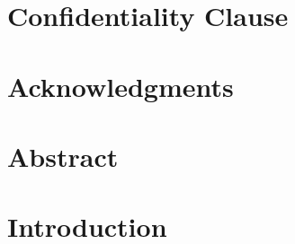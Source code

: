 \documentclass[11pt, twoside]{article}
\numberwithin{equation}{section}
\numberwithin{table}{section}
\numberwithin{figure}{section}
\begin{document}
\thispagestyle{empty}	


\newpage



\thispagestyle{empty}
\section*{Confidentiality Clause}

\clearpage





\newpage
\thispagestyle{empty}
\section*{Acknowledgments}




\newpage
\thispagestyle{empty}
\section*{Abstract}



	
\fancyhf{}
\fancyhead[LO,RE]{\footnotesize \nouppercase{\leftmark}}
\thispagestyle{empty}
\tableofcontents
\newpage 



\setcounter{page}{1} 





\fancyhf{}
\fancyhead[LO]{\footnotesize \nouppercase{\rightmark}}
\fancyhead[RE]{\footnotesize \nouppercase{\leftmark}}
\fancyhead[RO,LE]{\footnotesize \thepage}

\thispagestyle{plain}
\section{Introduction} \label{sec:introduction}

\end{document}
